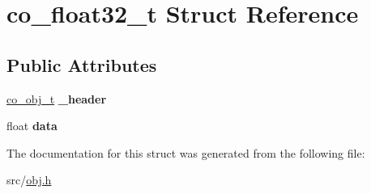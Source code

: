 \hypertarget{structco__float32__t}{\section{co\-\_\-float32\-\_\-t Struct Reference}
\label{structco__float32__t}
}
\subsection*{Public Attributes}
\begin{DoxyCompactItemize}
\item 
\hypertarget{structco__float32__t_a3b065acc6d778f166377c528b56f683d}{\hyperlink{structco__obj__t}{co\-\_\-obj\-\_\-t} {\bfseries \-\_\-header}}\label{structco__float32__t_a3b065acc6d778f166377c528b56f683d}

\item 
\hypertarget{structco__float32__t_a8692ad569321d72e3e772fbc3519cf56}{float {\bfseries data}}\label{structco__float32__t_a8692ad569321d72e3e772fbc3519cf56}

\end{DoxyCompactItemize}


The documentation for this struct was generated from the following file\-:\begin{DoxyCompactItemize}
\item 
src/\hyperlink{obj_8h}{obj.\-h}\end{DoxyCompactItemize}
